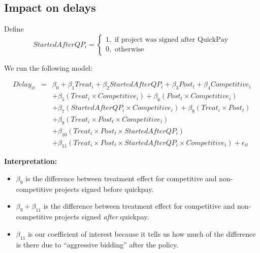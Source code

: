 \documentclass[
]{article}
\providecommand{\tightlist}{%
  \setlength{\itemsep}{0pt}\setlength{\parskip}{0pt}}
\begin{document}
\hypertarget{impact-on-delays}{%
\subsection{Impact on delays}\label{impact-on-delays}}

Define
\[ StartedAfterQP_i = \begin{cases} 1, \text{ if project was signed after QuickPay}\\
0, \text{ otherwise} \end{cases}\]

We run the following model:

\[\begin{aligned} Delay_{it} &=& \beta_0 +\beta_1 Treat_i+ \beta_2 StartedAfterQP_i+ \beta_3 Post_t+ \beta_4 Competitive_i\\ && +  \beta_5 (Treat_i \times Competitive_i) + \beta_6 (Post_t \times Competitive_i)\\ && +  \beta_7 (StartedAfterQP_i \times Competitive_i) +\beta_8 (Treat_i \times Post_t)\\ && + \beta_9 (Treat_i \times Post_t \times Competitive_i) \\ && + \beta_{10} (Treat_i \times Post_t \times StartedAfterQP_i )\\ && + \beta_{11} (Treat_i \times Post_t \times StartedAfterQP_i \times Competitive_i) + \epsilon_{it} \end{aligned}\]

\textbf{Interpretation:}

\begin{itemize}
\tightlist
\item
  \(\beta_9\) is the difference between treatment effect for competitive
  and non-competitive projects signed before quickpay.
\item
  \(\beta_9 + \beta_{11}\) is the difference between treatment effect
  for competitive and non-competitive projects signed \emph{after}
  quickpay.
\item
  \(\beta_{11}\) is our coefficient of interest because it tells us how
  much of the difference is there due to ``aggressive bidding'' after
  the policy.
\end{itemize}
\end{document}
